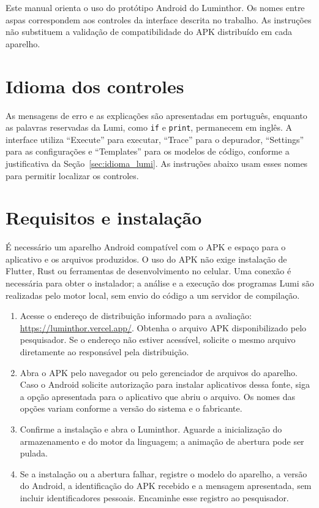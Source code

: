 
Este manual orienta o uso do protótipo Android do Luminthor. Os nomes entre aspas
correspondem aos controles da interface descrita no trabalho. As instruções não
substituem a validação de compatibilidade do APK distribuído em cada aparelho.

\section*{Idioma dos controles}

As mensagens de erro e as explicações são apresentadas em português, enquanto
as palavras reservadas da Lumi, como \texttt{if} e \texttt{print}, permanecem em
inglês. A interface utiliza ``Execute'' para executar, ``Trace'' para o depurador,
``Settings'' para as configurações e ``Templates'' para os modelos de código,
conforme a justificativa da Seção~\ref{sec:idioma_lumi}. As instruções abaixo
usam esses nomes para permitir localizar os controles.

\section*{Requisitos e instalação}

É necessário um aparelho Android compatível com o APK e espaço para o aplicativo
e os arquivos produzidos. O uso do APK não exige instalação de Flutter, Rust ou
ferramentas de desenvolvimento no celular. Uma conexão é necessária para obter o
instalador; a análise e a execução dos programas Lumi são realizadas pelo motor
local, sem envio do código a um servidor de compilação.

\begin{enumerate}
    \item Acesse o endereço de distribuição informado para a avaliação:
    \url{https://luminthor.vercel.app/}. Obtenha o arquivo APK disponibilizado pelo
    pesquisador. Se o endereço não estiver acessível, solicite o mesmo arquivo
    diretamente ao responsável pela distribuição.
    \item Abra o APK pelo navegador ou pelo gerenciador de arquivos do aparelho.
    Caso o Android solicite autorização para instalar aplicativos dessa fonte,
    siga a opção apresentada para o aplicativo que abriu o arquivo. Os nomes das
    opções variam conforme a versão do sistema e o fabricante.
    \item Confirme a instalação e abra o Luminthor. Aguarde a inicialização do
    armazenamento e do motor da linguagem; a animação de abertura pode ser pulada.
    \item Se a instalação ou a abertura falhar, registre o modelo do aparelho, a
    versão do Android, a identificação do APK recebido e a mensagem apresentada,
    sem incluir identificadores pessoais. Encaminhe esse registro ao pesquisador.
\end{enumerate}


